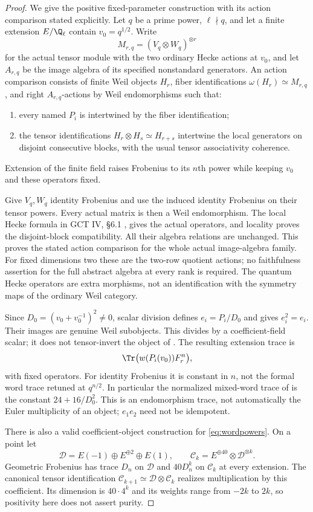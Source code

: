 \begin{proof}
We give the positive fixed-parameter construction with its
action comparison stated explicitly. Let $q$ be a prime power,
$\ell\nmid q$, and let a finite extension $E/\Q_\ell$
contain $v_0=q^{1/2}$.
Write
\[
 M_{r,q}=(V_q\otimes W_q)^{\otimes r}
\]
for the actual tensor module with the two ordinary Hecke
actions at $v_0$, and let $A_{r,q}$ be the image algebra of its
specified nonstandard generators. An action comparison consists
of finite Weil objects $H_r$, fiber identifications
$\omega(H_r)\simeq M_{r,q}$, and right $A_{r,q}$-actions
by Weil endomorphisms such that:
\begin{enumerate}
\item every named $P_i$ is intertwined by the fiber
identification;
\item the tensor identifications $H_r\otimes H_s\simeq H_{r+s}$
intertwine the local generators on disjoint consecutive blocks,
with the usual tensor associativity coherence.
\end{enumerate}
Extension of the finite field raises Frobenius to its $n$th
power while keeping $v_0$ and these operators fixed.

Give $V_q,W_q$ identity Frobenius and use the induced identity
Frobenius on their tensor powers. Every actual matrix is then
a Weil endomorphism. The local Hecke formula in
GCT IV, \S6.1 \cite[\S6.1, p.~33]{IV}, gives the actual operators, and locality proves
the disjoint-block compatibility. All their algebra relations
are unchanged. This proves the stated action comparison for
the whole actual image-algebra family.
For fixed dimensions two these are the two-row quotient actions;
no faithfulness assertion for the full abstract algebra at
every rank is required. The quantum Hecke operators are extra
morphisms, not an identification with the symmetry maps of the
ordinary Weil category.

Since $D_0=(v_0+v_0^{-1})^2\ne0$, scalar division defines
$e_i=P_i/D_0$ and gives $e_i^2=e_i$. Their images are genuine
Weil subobjects. This divides by a coefficient-field scalar;
it does not tensor-invert the object of .
The resulting extension trace is
\[
 \Tr\bigl(w(P_i(v_0))F_r^n\bigr),
\]
with fixed operators. For identity Frobenius it is constant
in $n$, not the formal word trace retuned at $q^{n/2}$.
In particular the normalized mixed-word trace of 
is the constant $24+16/D_0^2$. This is an endomorphism trace,
not automatically the Euler multiplicity of an object;
$e_1e_2$ need not be idempotent.

There is also a valid coefficient-object construction for
\eqref{eq:wordpowers}. On a point let
\[
 \mathcal D=E(-1)\oplus E^{\oplus2}\oplus E(1),\qquad
 \mathcal C_k=E^{\oplus40}\otimes\mathcal D^{\otimes k}.
\]
Geometric Frobenius has trace $D_n$ on $\mathcal D$ and
$40D_n^k$ on $\mathcal C_k$ at every extension.
The canonical tensor identification
$\mathcal C_{k+1}\simeq\mathcal D\otimes\mathcal C_k$
realizes multiplication by this coefficient.
Its dimension is $40\cdot4^k$ and its weights range from
$-2k$ to $2k$, so positivity here does not assert purity.


\end{proof}
